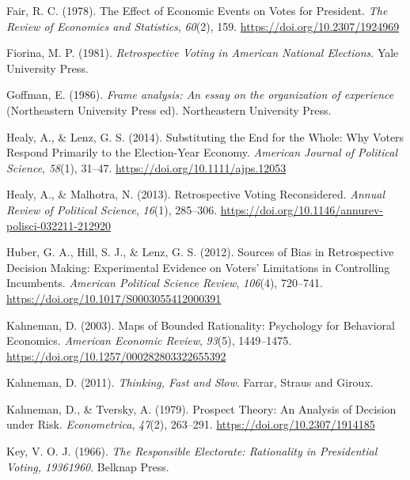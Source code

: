 \documentclass[
]{article}
\newlength{\cslhangindent}
\newlength{\cslentryspacingunit} %
\newenvironment{CSLReferences}[2] %
 {%
  \setlength{\parindent}{0pt}
  \ifodd #1
  \let\oldpar\par
  \def\par{\hangindent=\cslhangindent\oldpar}
  \fi
  \setlength{\parskip}{#2\cslentryspacingunit}
 }%
 {}
\begin{document}
\begin{CSLReferences}{1}{0}
\leavevmode{}%
Fair, R. C. (1978). The {Effect} of {Economic Events} on {Votes} for
{President}. \emph{The Review of Economics and Statistics},
\emph{60}(2), 159. \url{https://doi.org/10.2307/1924969}

\leavevmode{}%
Fiorina, M. P. (1981). \emph{Retrospective {Voting} in {American
National Elections}}. {Yale University Press}.

\leavevmode{}%
Goffman, E. (1986). \emph{Frame analysis: An essay on the organization
of experience} (Northeastern University Press ed). {Northeastern
University Press}.

\leavevmode{}%
Healy, A., \& Lenz, G. S. (2014). Substituting the {End} for the
{Whole}: {Why Voters Respond Primarily} to the {Election-Year Economy}.
\emph{American Journal of Political Science}, \emph{58}(1), 31--47.
\url{https://doi.org/10.1111/ajps.12053}

\leavevmode{}%
Healy, A., \& Malhotra, N. (2013). Retrospective {Voting Reconsidered}.
\emph{Annual Review of Political Science}, \emph{16}(1), 285--306.
\url{https://doi.org/10.1146/annurev-polisci-032211-212920}

\leavevmode{}%
Huber, G. A., Hill, S. J., \& Lenz, G. S. (2012). Sources of {Bias} in
{Retrospective Decision Making}: {Experimental Evidence} on {Voters}'
{Limitations} in {Controlling Incumbents}. \emph{American Political
Science Review}, \emph{106}(4), 720--741.
\url{https://doi.org/10.1017/S0003055412000391}

\leavevmode{}%
Kahneman, D. (2003). Maps of {Bounded Rationality}: {Psychology} for
{Behavioral Economics}. \emph{American Economic Review}, \emph{93}(5),
1449--1475. \url{https://doi.org/10.1257/000282803322655392}

\leavevmode{}%
Kahneman, D. (2011). \emph{Thinking, {Fast} and {Slow}}. {Farrar, Straus
and Giroux}.

\leavevmode{}%
Kahneman, D., \& Tversky, A. (1979). Prospect {Theory}: {An Analysis} of
{Decision} under {Risk}. \emph{Econometrica}, \emph{47}(2), 263--291.
\url{https://doi.org/10.2307/1914185}

\leavevmode{}%
Key, V. O. J. (1966). \emph{The {Responsible Electorate}: {Rationality}
in {Presidential Voting}, 1936{\textendash}1960}. {Belknap Press}.


\end{CSLReferences}
\end{document}
